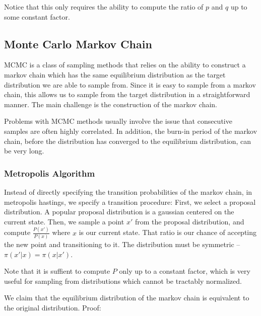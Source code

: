 \documentclass[12pt]{article}
\begin{document}
Notice that this only requires the ability to compute the ratio of $p$ and $q$ up to some constant factor.
\fi

\subsection{Monte Carlo Markov Chain}

MCMC is a class of sampling methods that relies on the ability to construct a markov chain which has the same equilibrium distribution as the target distribution we are able to sample from. Since it is easy to sample from a markov chain, this allows us to sample from the target distribution in a straightforward manner. The main challenge is the construction of the markov chain.

Problems with MCMC methods usually involve the issue that consecutive samples are often highly correlated. In addition, the burn-in period of the markov chain, before the distribution has converged to the equilibrium distribution, can be very long. 

\subsubsection{Metropolis Algorithm}

Instead of directly specifying the transition probabilities of the markov chain, in metropolis hastings, we specify a transition procedure:
First, we select a proposal distribution. A popular proposal distribution is a gaussian centered on the current state. Then, we sample a point $x'$ from the proposal distribution, and compute $\frac{P(x')}{P(x)}$ where $x$ is our current state. That ratio is our chance of accepting the new point and transitioning to it. The distribution must be symmetric -- $\pi(x'|x) = \pi(x|x')$.

Note that it is suffient to compute $P$ only up to a constant factor, which is very useful for sampling from distributions which cannot be tractably normalized. 

We claim that the equilibrium distribution of the markov chain is equivalent to the original distribution. Proof:

\end{document}
